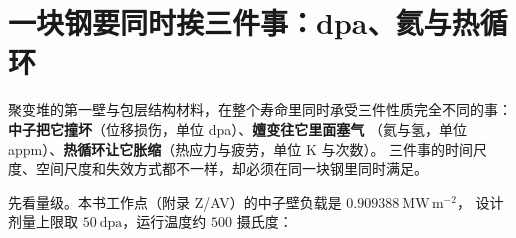 %
%
%

\section{一块钢要同时挨三件事：dpa、氦与热循环}
\label{sec:app-ay-three}

聚变堆的第一壁与包层结构材料，在整个寿命里同时承受三件性质完全不同的事：
\textbf{中子把它撞坏}（位移损伤，单位 dpa）、\textbf{嬗变往它里面塞气}
（氦与氢，单位 appm）、\textbf{热循环让它胀缩}（热应力与疲劳，单位 K 与次数）。
三件事的时间尺度、空间尺度和失效方式都不一样，却必须在同一块钢里同时满足。

先看量级。本书工作点（附录 Z/AV）的中子壁负载是 $0.909388\ \mathrm{MW\,m^{-2}}$，
设计剂量上限取 $50\ \mathrm{dpa}$，运行温度约 $500$ 摄氏度：

